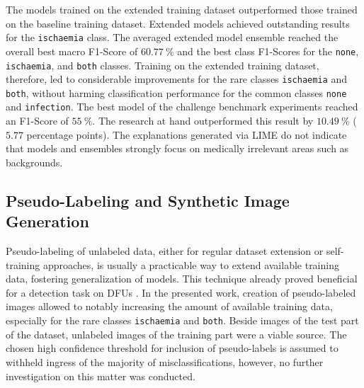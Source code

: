 \documentclass[runningheads]{llncs}
\begin{document}
The models trained on the extended training dataset outperformed those trained on the baseline training dataset. Extended models achieved outstanding results for the \texttt{ischaemia} class. The averaged extended model ensemble reached the overall best macro F1-Score of $60.77~\%$ and the best class F1-Scores for the \texttt{none}, \texttt{ischaemia}, and \texttt{both} classes. Training on the extended training dataset, therefore, led to considerable improvements for the rare classes \texttt{ischaemia} and \texttt{both}, without harming classification performance for the common classes \texttt{none} and \texttt{infection}. The best model of the challenge benchmark experiments \cite{10.1109/BHI50953.2021.9508563} reached an F1-Score of $55~\%$. The research at hand outperformed this result by $10.49~\%$ ($5.77$ percentage points). The explanations generated via LIME do not indicate that models and ensembles strongly focus on medically irrelevant areas such as backgrounds.



\subsection{Pseudo-Labeling and Synthetic Image Generation} %

Pseudo-labeling of unlabeled data, either for regular dataset extension or self-training approaches, is usually a practicable way to extend available training data, fostering generalization of models. This technique already proved beneficial for a detection task on DFUs \cite{yap2021detection}. In the presented work, creation of pseudo-labeled images allowed to notably increasing the amount of available training data, especially for the rare classes \texttt{ischaemia} and \texttt{both}. Beside images of the test part of the dataset, unlabeled images of the training part were a viable source. The chosen high confidence threshold for inclusion of pseudo-labels is assumed to withheld ingress of the majority of misclassifications, however, no further investigation on this matter was conducted.
\end{document}
